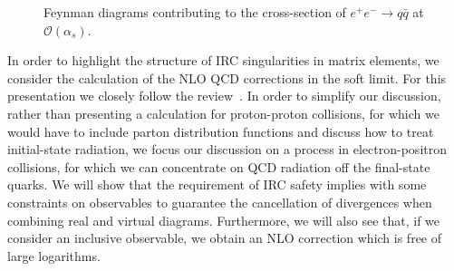 \begin{figure}
\begin{center}
\caption{Feynman diagrams contributing to the cross-section of
  $e^{+}e^{-}\to q\bar{q}$ at $\mathcal{O}(\alpha_s)$.}\label{fig:sigma_nlo}
\end{center}
\end{figure}

In order to highlight the structure of IRC singularities in matrix elements, we consider the calculation of the NLO QCD corrections in the soft limit. For this presentation we closely follow the review~\cite{Luisoni:2015xha}.
%
In order to simplify our discussion, rather than presenting a
calculation for proton-proton collisions, for which we would have to
include parton distribution functions and  discuss how to treat
initial-state radiation, we focus our discussion on a process in
electron-positron collisions, for which we can concentrate on QCD
radiation off the final-state quarks. We will show that the requirement of
  IRC safety implies with some constraints on observables to guarantee
  the cancellation of divergences when combining real and virtual
  diagrams. Furthermore, we will also see that, if we consider an
inclusive observable, we obtain an NLO correction which is free of
large logarithms.

